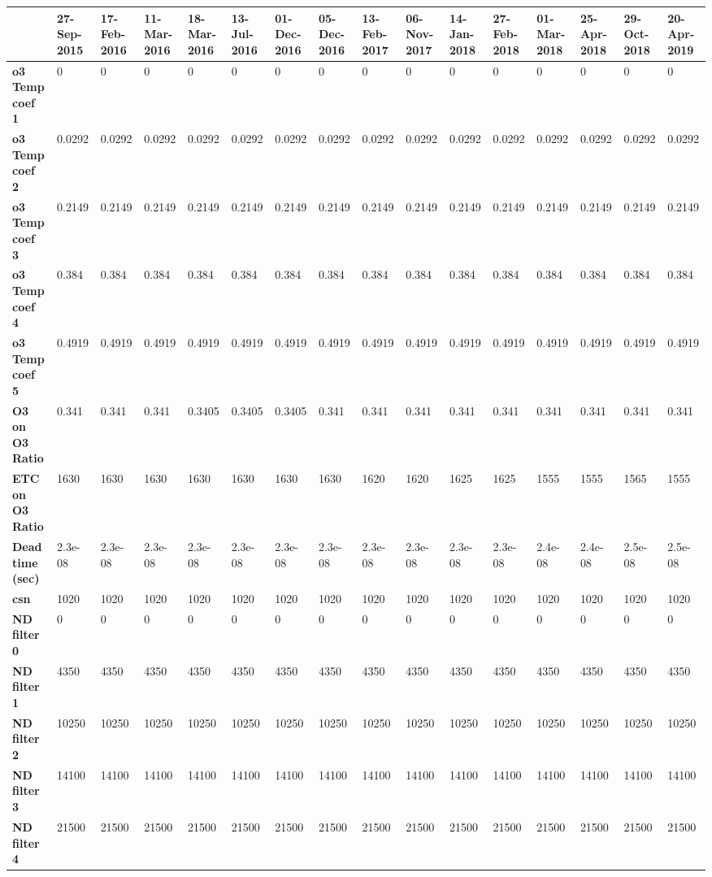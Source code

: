 \begin{footnotesize}\begin{longtable}{|l|l|l|l|l|l|l|l|l|l|l|l|l|l|l|l|}
\hline
&\textbf{27-Sep-2015}&\textbf{17-Feb-2016}&\textbf{11-Mar-2016}&\textbf{18-Mar-2016}&\textbf{13-Jul-2016}&\textbf{01-Dec-2016}&\textbf{05-Dec-2016}&\textbf{13-Feb-2017}&\textbf{06-Nov-2017}&\textbf{14-Jan-2018}&\textbf{27-Feb-2018}&\textbf{01-Mar-2018}&\textbf{25-Apr-2018}&\textbf{29-Oct-2018}&\textbf{20-Apr-2019}\\\hline
\textbf{o3 Temp coef 1}&0&0&0&0&0&0&0&0&0&0&0&0&0&0&0\\\hline
\textbf{o3 Temp coef 2}&0.0292&0.0292&0.0292&0.0292&0.0292&0.0292&0.0292&0.0292&0.0292&0.0292&0.0292&0.0292&0.0292&0.0292&0.0292\\\hline
\textbf{o3 Temp coef 3}&0.2149&0.2149&0.2149&0.2149&0.2149&0.2149&0.2149&0.2149&0.2149&0.2149&0.2149&0.2149&0.2149&0.2149&0.2149\\\hline
\textbf{o3 Temp coef 4}&0.384&0.384&0.384&0.384&0.384&0.384&0.384&0.384&0.384&0.384&0.384&0.384&0.384&0.384&0.384\\\hline
\textbf{o3 Temp coef 5}&0.4919&0.4919&0.4919&0.4919&0.4919&0.4919&0.4919&0.4919&0.4919&0.4919&0.4919&0.4919&0.4919&0.4919&0.4919\\\hline
\textbf{O3 on O3 Ratio}&0.341&0.341&0.341&0.3405&0.3405&0.3405&0.341&0.341&0.341&0.341&0.341&0.341&0.341&0.341&0.341\\\hline
\textbf{ETC on O3 Ratio}&1630&1630&1630&1630&1630&1630&1630&1620&1620&1625&1625&1555&1555&1565&1555\\\hline
\textbf{Dead time (sec)}&2.3e-08&2.3e-08&2.3e-08&2.3e-08&2.3e-08&2.3e-08&2.3e-08&2.3e-08&2.3e-08&2.3e-08&2.3e-08&2.4e-08&2.4e-08&2.5e-08&2.5e-08\\\hline
\textbf{csn}&1020&1020&1020&1020&1020&1020&1020&1020&1020&1020&1020&1020&1020&1020&1020\\\hline
\textbf{ND filter 0}&0&0&0&0&0&0&0&0&0&0&0&0&0&0&0\\\hline
\textbf{ND filter 1}&4350&4350&4350&4350&4350&4350&4350&4350&4350&4350&4350&4350&4350&4350&4350\\\hline
\textbf{ND filter 2}&10250&10250&10250&10250&10250&10250&10250&10250&10250&10250&10250&10250&10250&10250&10250\\\hline
\textbf{ND filter 3}&14100&14100&14100&14100&14100&14100&14100&14100&14100&14100&14100&14100&14100&14100&14100\\\hline
\textbf{ND filter 4}&21500&21500&21500&21500&21500&21500&21500&21500&21500&21500&21500&21500&21500&21500&21500\\\hline

\end{longtable}
\end{footnotesize}
